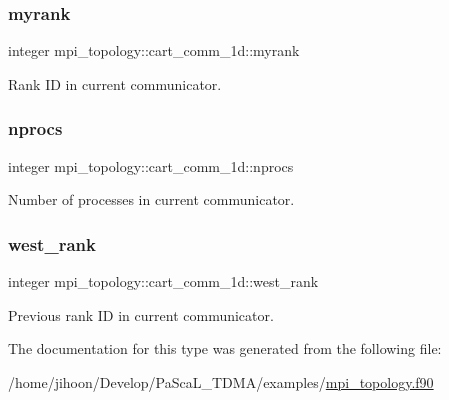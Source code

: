 \subsubsection{\texorpdfstring{myrank}{myrank}}
{\footnotesize\ttfamily integer mpi\+\_\+topology\+::cart\+\_\+comm\+\_\+1d\+::myrank}



Rank ID in current communicator. 

\mbox{\label{structmpi__topology_1_1cart__comm__1d_adf78d1be6ca59cada6cc444edde4c3fc}} 
\subsubsection{\texorpdfstring{nprocs}{nprocs}}
{\footnotesize\ttfamily integer mpi\+\_\+topology\+::cart\+\_\+comm\+\_\+1d\+::nprocs}



Number of processes in current communicator. 

\mbox{\label{structmpi__topology_1_1cart__comm__1d_a63baa1f74126ffda0b67af1c487dcd45}} 
\subsubsection{\texorpdfstring{west\+\_\+rank}{west\_rank}}
{\footnotesize\ttfamily integer mpi\+\_\+topology\+::cart\+\_\+comm\+\_\+1d\+::west\+\_\+rank}



Previous rank ID in current communicator. 



The documentation for this type was generated from the following file\+:\begin{DoxyCompactItemize}
\item 
/home/jihoon/\+Develop/\+Pa\+Sca\+L\+\_\+\+T\+D\+M\+A/examples/\hyperlink{mpi__topology_8f90}{mpi\+\_\+topology.\+f90}\end{DoxyCompactItemize}
